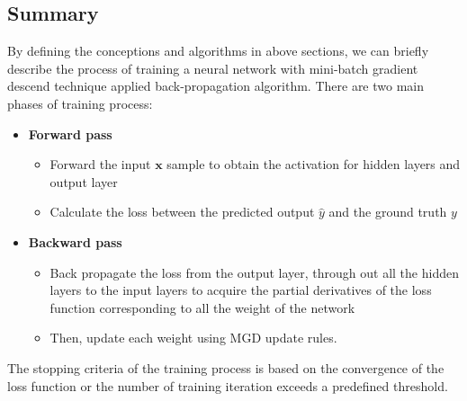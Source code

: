 \subsection{Summary}
\hspace{0.45cm} By defining the conceptions and algorithms in above sections, we can briefly describe the process of training a 
neural network with mini-batch gradient descend technique applied back-propagation algorithm. 
There are two main phases of training process:
\begin{itemize}
    \item \textbf{Forward pass}
    \begin{itemize}
        \item Forward the input $\pmb{x}$ sample to obtain the activation for hidden layers and output layer
        \item Calculate the loss between the predicted output $\hat{y}$ and the ground truth $y$
    \end{itemize}
    \item \textbf{Backward pass}
    \begin{itemize}
        \item Back propagate the loss from the output layer, through out all the hidden layers to the input layers to acquire the partial derivatives of the loss function corresponding to all the weight of the network
        \item Then, update each weight using MGD update rules.
    \end{itemize}
\end{itemize}\par
The stopping criteria of the training process is based on the convergence of the loss function or the number of training iteration exceeds a predefined threshold.

